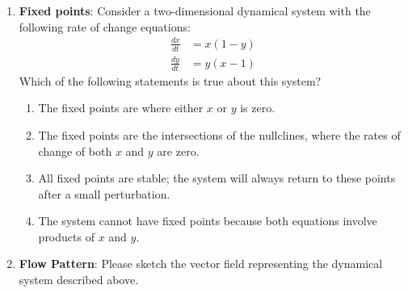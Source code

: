 \documentclass[11pt,letterpaper]{article}
\begin{document}
\begin{enumerate}
    \item \textbf{Fixed points}: Consider a two-dimensional dynamical system with the following rate of change equations:
    \begin{align*}
    \frac{dx}{dt} &= x(1 - y) \\
    \frac{dy}{dt} &= y(x - 1)
    \end{align*}
    Which of the following statements is true about this system?
    \begin{enumerate}
        \item The fixed points are where either $x$ or $y$ is zero.
        \item The fixed points are the intersections of the nullclines, where the rates of change of both $x$ and $y$ are zero.
        \item All fixed points are stable; the system will always return to these points after a small perturbation.
        \item The system cannot have fixed points because both equations involve products of $x$ and $y$.
    \end{enumerate}

    \item \textbf{Flow Pattern}: Please sketch the vector field representing the dynamical system described above.

\end{enumerate}
\pagebreak
\end{document}
